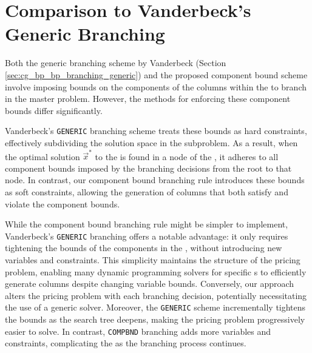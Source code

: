 \section{Comparison to Vanderbeck's Generic Branching}\label{sec:cmpbnd_simdif}
Both the generic branching scheme by Vanderbeck (Section \ref{sec:cg_bp_bp_branching_generic}) and the proposed component bound scheme involve imposing bounds on the components of the columns within the \SP{} to branch in the master problem. However, the methods for enforcing these component bounds differ significantly.

Vanderbeck's \texttt{GENERIC} branching scheme treats these bounds as hard constraints, effectively subdividing the solution space in the subproblem. As a result, when the optimal solution $\vec{x}^*$ to the \IP{} is found in a node of the \RMP{}, it adheres to all component bounds imposed by the branching decisions from the root to that node. In contrast, our component bound branching rule introduces these bounds as soft constraints, allowing the generation of columns that both satisfy and violate the component bounds.

While the component bound branching rule might be simpler to implement, Vanderbeck's \texttt{GENERIC} branching offers a notable advantage: it only requires tightening the bounds of the components in the \SP{}, without introducing new variables and constraints. This simplicity maintains the structure of the pricing problem, enabling many dynamic programming solvers for specific \IP{}s to efficiently generate columns despite changing variable bounds. Conversely, our approach alters the pricing problem with each branching decision, potentially necessitating the use of a generic \MIP{} solver. Moreover, the \texttt{GENERIC} scheme incrementally tightens the bounds as the search tree deepens, making the pricing problem progressively easier to solve. In contrast, \texttt{COMPBND} branching adds more variables and constraints, complicating the \SP{} as the branching process continues.
